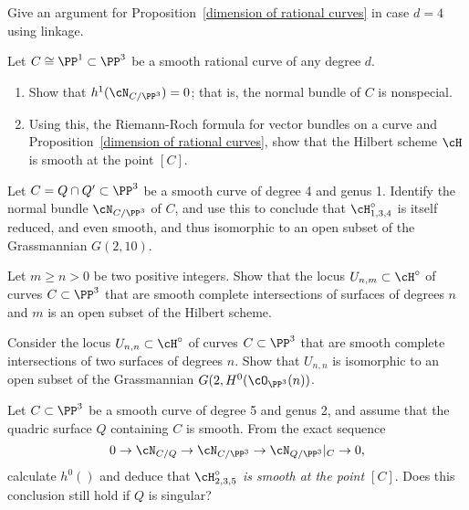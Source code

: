 \begin{exercise}
Give an argument for Proposition~\ref{dimension of rational curves} in case $d=4$ using linkage. 
\end{exercise}
\begin{exercise}
Let $C \cong \PP^1 \subset \PP^3$ be a smooth rational curve of any degree $d$. 
\begin{enumerate}
\item Show that $h^1(\cN_{C/\PP^3}) = 0$; that is, the normal bundle of $C$ is nonspecial.
\item Using this, the Riemann-Roch formula for vector bundles on a curve and Proposition~\ref{dimension of rational curves}, show that the Hilbert scheme $\cH$ is smooth at the point $[C]$.
\end{enumerate} 
\end{exercise}

\begin{exercise}\label{hilb 1,3,4}
Let $C = Q \cap Q' \subset \PP^3$ be a smooth curve of degree 4 and genus 1. Identify the normal bundle $\cN_{C/\PP^3}$ of $C$, and use this to conclude that $\cH^\circ_{1,3,4}$ is itself reduced, and even smooth, and thus isomorphic to an open subset of the Grassmannian $G(2,10)$.
\end{exercise}

\begin{exercise}\label{complete intersection open}
Let $m \geq n >0$ be two positive integers. Show that the locus $U_{n,m} \subset \cH^\circ$ of curves $C \subset \PP^3$ that are smooth complete intersections of surfaces of degrees $n$ and $m$ is an open subset of the Hilbert scheme.
\end{exercise}

\begin{exercise}\label{first complete intersection exercise}
Consider  the locus $U_{n,n} \subset \cH^\circ$ of curves $C \subset \PP^3$ that are smooth complete intersections of two surfaces of degrees $n$. Show that $U_{n,n}$ 
is isomorphic to an open subset of the Grassmannian $G(2, H^0(\cO_{\PP^3}(n))$.
\end{exercise}

\begin{exercise}
Let $C \subset \PP^3$ be a smooth curve of degree 5 and genus 2, and assume that the quadric surface $Q$ containing $C$ is smooth. From the exact sequence
$$
0 \to \cN_{C/Q} \to  \cN_{C/\PP^3} \to  \cN_{Q/\PP^3}|_C \to 0,
$$
calculate $h^0()$ and deduce that \emph{$\cH^\circ_{2,3,5}$ is smooth at the point $[C]$}. Does  this conclusion still hold if $Q$ is singular?
\end{exercise}

